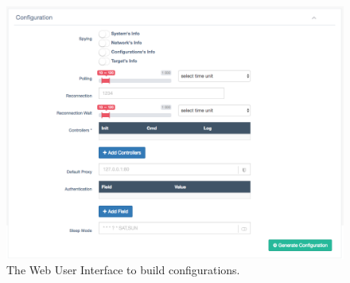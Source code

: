 \begin{figure}[h]
  \centering
  \includegraphics[scale=0.45]{./fig/configurationWUI.png}
  \caption{The Web User Interface to build configurations.}
    \label{fig:configuration-wui}
\end{figure}
